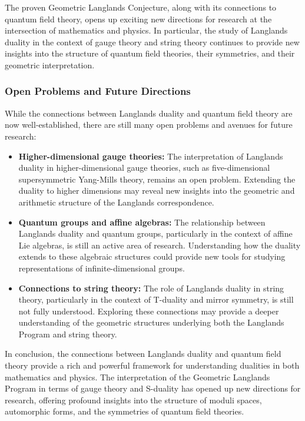 \documentclass{article}
\theoremstyle{remark}
\begin{document}
The proven Geometric Langlands Conjecture, along with its connections to quantum field theory, opens up exciting new directions for research at the intersection of mathematics and physics. In particular, the study of Langlands duality in the context of gauge theory and string theory continues to provide new insights into the structure of quantum field theories, their symmetries, and their geometric interpretation.

\subsubsection{Open Problems and Future Directions}

While the connections between Langlands duality and quantum field theory are now well-established, there are still many open problems and avenues for future research:
\begin{itemize}
    \item \textbf{Higher-dimensional gauge theories:} The interpretation of Langlands duality in higher-dimensional gauge theories, such as five-dimensional supersymmetric Yang-Mills theory, remains an open problem. Extending the duality to higher dimensions may reveal new insights into the geometric and arithmetic structure of the Langlands correspondence.
    
    \item \textbf{Quantum groups and affine algebras:} The relationship between Langlands duality and quantum groups, particularly in the context of affine Lie algebras, is still an active area of research. Understanding how the duality extends to these algebraic structures could provide new tools for studying representations of infinite-dimensional groups.
    
    \item \textbf{Connections to string theory:} The role of Langlands duality in string theory, particularly in the context of T-duality and mirror symmetry, is still not fully understood. Exploring these connections may provide a deeper understanding of the geometric structures underlying both the Langlands Program and string theory.
\end{itemize}

In conclusion, the connections between Langlands duality and quantum field theory provide a rich and powerful framework for understanding dualities in both mathematics and physics. The interpretation of the Geometric Langlands Program in terms of gauge theory and S-duality has opened up new directions for research, offering profound insights into the structure of moduli spaces, automorphic forms, and the symmetries of quantum field theories.
\end{document}
